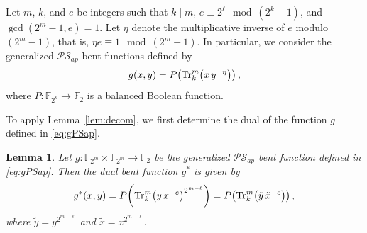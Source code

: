 \documentclass[12pt]{article}
\theoremstyle{plain}
\newtheorem{lemma}{Lemma}
\theoremstyle{definition}
\renewcommand{\to}{\rightarrow}
\newcommand{\Tr}{{\rm Tr}}
\begin{document}
	Let \(m\), \(k\), and \(e\) be integers such that \(k \mid m\),
	\(e \equiv 2^{\ell} \mod{(2^{k}-1)}\), and
	\(\gcd(2^{m}-1, e) = 1\).
	Let \(\eta\) denote the multiplicative inverse of \(e\) modulo \((2^{m}-1)\), that
	is, $\eta e \equiv 1 \mod{(2^{m}-1)}$.
	In particular, we consider the generalized $\mathcal{PS}_{ap}$ bent functions defined by
	\begin{equation}\label{eq:gPSap}
		g(x,y)=
		P\!\left(\Tr_{k}^{m}\!\left(x\, y^{-\eta}\right)\right),
	\end{equation}
	where $P \colon \mathbb{F}_{2^{k}} \to \mathbb{F}_2$ is a balanced Boolean
	function.
	
	To apply Lemma~\ref{lem:decom}, we first determine the dual of the function \(g\)
	defined in \eqref{eq:gPSap}.
	
	\begin{lemma}
		Let \(g \colon \mathbb{F}_{2^{m}} \times \mathbb{F}_{2^{m}} \to \mathbb{F}_2\)
		be the generalized \(\mathcal{PS}_{ap}\) bent function defined in
		\eqref{eq:gPSap}. Then the dual bent function \(g^{\ast}\) is given by
		\[
		g^{\ast}(x,y)
		=
		P\!\left(\Tr^{m}_{k}\!\left(y\, x^{-e}\right)^{2^{m-\ell}}\right)
		=
		P\!\left(\Tr^{m}_{k}\!\left(\tilde y\, \tilde x^{-e}\right)\right),
		\]
		where $\tilde y=y^{2^{m-\ell}}$ and $\tilde x=x^{2^{m-\ell}}$.
	\end{lemma}
\end{document}
